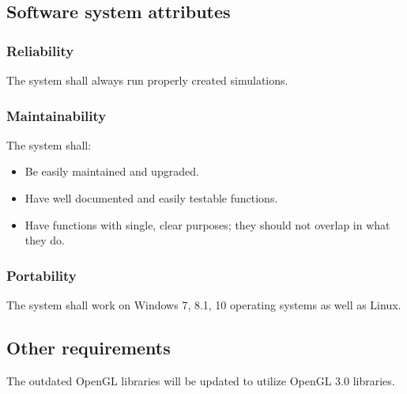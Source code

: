 \documentclass[10pt,journal,compsoc]{IEEEtran}
\begin{document}
\begin{flushleft}
\subsection{Software system attributes}
\vspace{3mm}
\subsubsection{Reliability}
\vspace{5mm}
The system shall always run properly created simulations.


\subsubsection{Maintainability}
\vspace{3mm}
The system shall:
\begin{itemize}
\item Be easily maintained and upgraded. 
\item Have well documented and easily testable functions.
\item Have functions with single, clear purposes; they should not overlap in what they do.
\end{itemize}

\subsubsection{Portability}
\vspace{3mm}
The system shall work on Windows 7, 8.1, 10 operating systems as well as Linux.

\subsection{Other requirements}
\vspace{3mm}
The outdated OpenGL libraries will be updated to utilize OpenGL 3.0 libraries.

\vfill

\newpage

\begin{landscape}

\end{landscape}
\end{flushleft}
\end{document}
